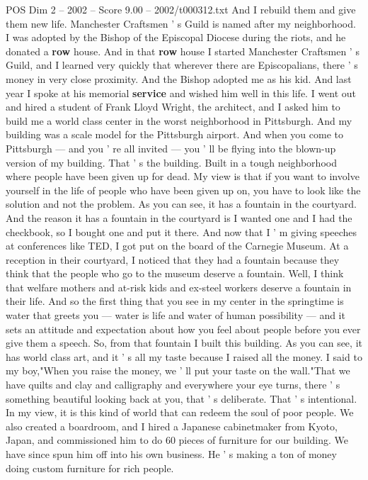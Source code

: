 \begin{textsample}{POS Dim 2 – 2002 – Score 9.00 – 2002/t000312.txt}
And I rebuild them and give them new life.
Manchester Craftsmen ' s Guild is named after my neighborhood.
I was adopted by the Bishop of the Episcopal Diocese during the riots, and he donated a \textbf{row} house.
And in that \textbf{row} house I started Manchester Craftsmen ' s Guild, and I learned very quickly that wherever there are Episcopalians, there ' s money in very close proximity.
And the Bishop adopted me as his kid.
And last year I spoke at his memorial \textbf{service} and wished him well in this life.
I went out and hired a student of Frank Lloyd Wright, the architect, and I asked him to build me a world class center in the worst neighborhood in Pittsburgh.
And my building was a scale model for the Pittsburgh airport.
And when you come to Pittsburgh — and you ' re all invited — you ' ll be flying into the blown-up version of my building.
That ' s the building.
Built in a tough neighborhood where people have been given up for dead.
My view is that if you want to involve yourself in the life of people who have been given up on, you have to look like the solution and not the problem.
As you can see, it has a fountain in the courtyard.
And the reason it has a fountain in the courtyard is I wanted one and I had the checkbook, so I bought one and put it there.
And now that I ' m giving speeches at conferences like TED, I got put on the board of the Carnegie Museum.
At a reception in their courtyard, I noticed that they had a fountain because they think that the people who go to the museum deserve a fountain.
Well, I think that welfare mothers and at-risk kids and ex-steel workers deserve a fountain in their life.
And so the first thing that you see in my center in the springtime is water that greets you — water is life and water of human possibility — and it sets an attitude and expectation about how you feel about people before you ever give them a speech.
So, from that fountain I built this building.
As you can see, it has world class art, and it ' s all my taste because I raised all the money.
I said to my boy,"When you raise the money, we ' ll put your taste on the wall."That we have quilts and clay and calligraphy and everywhere your eye turns, there ' s something beautiful looking back at you, that ' s deliberate.
That ' s intentional.
In my view, it is this kind of world that can redeem the soul of poor people.
We also created a boardroom, and I hired a Japanese cabinetmaker from Kyoto, Japan, and commissioned him to do 60 pieces of furniture for our building.
We have since spun him off into his own business.
He ' s making a ton of money doing custom furniture for rich people.

\end{textsample}
